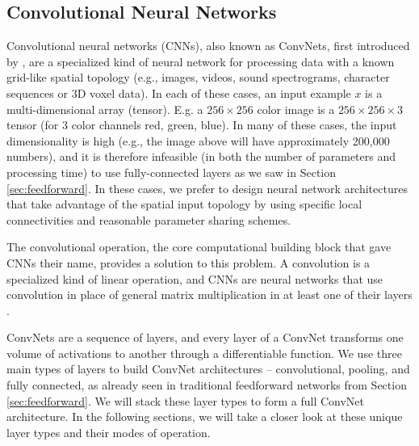 \subsection{Convolutional Neural Networks}
Convolutional neural networks (\acp{CNN}), also known as ConvNets, first introduced by \cite{LeCun:1989}, are a specialized kind of neural network for processing data with a known grid-like spatial topology (e.g., images, videos, sound spectrograms, character sequences or 3D voxel data). In each of these cases, an input example  $x$ is a multi-dimensional array (tensor). E.g. a $256\times256$ color image is a $256\times256\times3$ tensor (for 3 color channels red, green, blue).  In many of these cases, the input dimensionality is high (e.g., the image above will have approximately 200,000 numbers), and it is therefore infeasible (in both the number of parameters and processing time) to use fully-connected layers as we saw in Section \ref{sec:feedforward}. In these cases, we prefer to design neural network architectures that take advantage of the spatial input topology by using specific local connectivities and reasonable parameter sharing schemes.

The convolutional operation,  the core computational building block  that gave \acp{CNN} their name, provides a solution to this problem. A convolution is a specialized kind of linear operation, and \acp{CNN} are neural networks that use convolution in place of general matrix multiplication in at least one of their layers \parencite{Goodfellow:2016}.

ConvNets are a sequence of layers, and every layer of a ConvNet transforms one volume of activations to another through a differentiable function. We use three main types of layers to build ConvNet architectures -- convolutional, pooling, and fully connected, as already seen in traditional feedforward networks from Section \ref{sec:feedforward}. We will stack these layer types to form a full ConvNet architecture. In the following sections, we will take a closer look at these unique layer types and their modes of operation.
